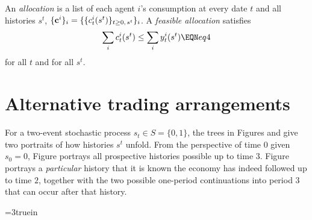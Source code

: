 
\medskip
{}   An {\it allocation} is
a list of each agent $i$'s consumption at every date $t$ and 
all histories $s^t$, 
$\{{\bf c}^i\}_i=\{\{c_t^i(s^t)\}_{t\geq0,\,s^t}\}_i$.
A {\it feasible allocation} satisfies
$$\sum_i c_t^i(s^t) \leq \sum_i y_t^i(s^t)  \EQN eq4 $$
for all $t$ and for all $s^t$.


\section{Alternative trading arrangements}
For a two-event stochastic process $s_t \in S = \{0, 1\}$, the
trees in Figures  and  %
 give
two portraits of how histories $s^t$ unfold.  From the
perspective of time $0$ given $s_0=0$, Figure  portrays
all prospective histories possible up to time
$3$. Figure  portrays  a {\it particular\/} history that it is
known the economy has indeed followed up to   time $2$, together
with the  two possible one-period continuations into period $3$
that can occur after that history.


\centerline{\epsfxsize=3truein} \caption{The
Arrow-Debreu commodity space for a two-state Markov chain. At time
$0$, there are trades in time $t=3$ goods for each of the eight
nodes that signify histories that can possibly be reached starting from
the node at time $0$.} 
\endfigure



